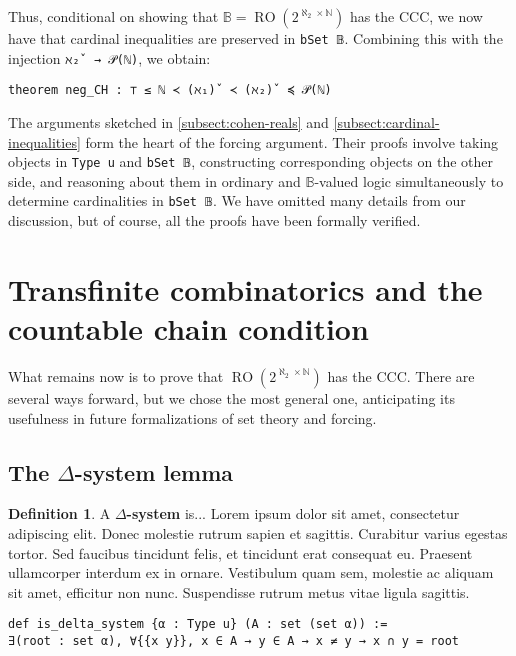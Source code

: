 \documentclass[a4paper,USenglish,cleveref, autoref]{lipics-v2019}
\newcommand{\B}{\mathbb{B}}
\newcommand{\lil}{\lstinline}
\theoremstyle{definition}
\newtheorem{defn}[theorem]{Definition}
\begin{document}
Thus, conditional on showing that $\B = \operatorname{RO}(2^{\aleph_2 \times \mathbb{N}})$ has the CCC, we now have that cardinal inequalities are preserved in \lstinline{bSet 𝔹}. Combining this with the injection \lil{ℵ₂̌  → 𝒫(ℕ)}, we obtain:
\begin{lstlisting}
theorem neg_CH : ⊤ ≤ ℕ ≺ (ℵ₁)̌  ≺ (ℵ₂)̌  ≼ 𝒫(ℕ)
\end{lstlisting}

The arguments sketched in \autoref{subsect:cohen-reals} and \autoref{subsect:cardinal-inequalities} form the heart of the forcing argument. Their proofs involve taking objects in \lil{Type u} and \lil{bSet 𝔹}, constructing corresponding objects on the other side, and reasoning about them in ordinary and $\B$-valued logic simultaneously to determine cardinalities in \lstinline{bSet 𝔹}. We have omitted many details from our discussion, but of course, all the proofs have been formally verified.

\section{Transfinite combinatorics and the countable chain condition}
\label{sect:ccc}
What remains now is to prove that $\operatorname{RO}(2^{\aleph_2 \times \mathbb{N}})$ has the CCC. There are several ways forward, but we chose the most general one, anticipating its usefulness in future formalizations of set theory and forcing.

\subsection{The $\Delta$-system lemma}

\begin{defn}
  A \textbf{$\Delta$-system} is... Lorem ipsum dolor sit amet, consectetur adipiscing elit. Donec molestie rutrum sapien et sagittis. Curabitur varius egestas tortor. Sed faucibus tincidunt felis, et tincidunt erat consequat eu. Praesent ullamcorper interdum ex in ornare. Vestibulum quam sem, molestie ac aliquam sit amet, efficitur non nunc. Suspendisse rutrum metus vitae ligula sagittis. 
\end{defn}
\begin{lstlisting}
def is_delta_system {α : Type u} (A : set (set α)) :=
∃(root : set α), ∀{{x y}}, x ∈ A → y ∈ A → x ≠ y → x ∩ y = root
\end{lstlisting}
\end{document}
